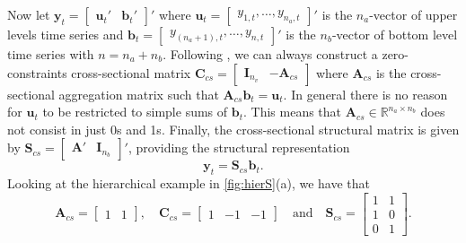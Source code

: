 \documentclass[a4paper,11pt]{article}
\newcommand{\bvet}{\bm{b}}
\newcommand{\uvet}{\bm{u}}
\newcommand{\yvet}{\bm{y}}
\newcommand{\Avet}{\bm{A}}
\newcommand{\Cvet}{\bm{C}}
\newcommand{\Ivet}{\bm{I}}
\newcommand{\Svet}{\bm{S}}
\theoremstyle{definition}
\begin{document}
Now let $\yvet_t = \begin{bmatrix}\uvet_t' & \bvet_t'\end{bmatrix}'$ where $\uvet_t = \begin{bmatrix} y_{1,t}, \dots, y_{n_a,t}\end{bmatrix}'$ is the $n_a$-vector of upper levels time series and $\bvet_t = \begin{bmatrix} y_{(n_a+1),t}, \dots, y_{n,t} \end{bmatrix}'$ is the $n_b$-vector of bottom level time series with $n = n_a+n_b$. Following \cite{giro2022}, we can always construct a zero-constraints cross-sectional matrix $\Cvet_{cs}=\begin{bmatrix}\Ivet_{n_v} & -\Avet_{cs}\end{bmatrix}$ where $\Avet_{cs}$ is the cross-sectional aggregation matrix such that $\Avet_{cs}\bvet_t = \uvet_t$. In general there is no reason for $\uvet_t$ to be restricted to simple sums of $\bvet_t$. This means that $\Avet_{cs} \in \mathbb{R}^{n_a\times n_b}$ does not consist in just 0s and 1s. Finally, the cross-sectional structural matrix is given by $\Svet_{cs} = \begin{bmatrix}\Avet' & \Ivet_{n_b}\end{bmatrix}'$, providing the structural representation \citep{hyndman2011}
$$
	\yvet_t = \Svet_{cs} \bvet_t.
$$
Looking at the hierarchical example in \autoref{fig:hierS}(a), we have that
$$
	\Avet_{cs} = \begin{bmatrix} 1 & 1 \end{bmatrix}, \quad \Cvet_{cs} = \begin{bmatrix}1 & -1 & -1 \end{bmatrix} \quad \text{and} \quad \Svet_{cs} = \begin{bmatrix}
		1 & 1 \\
		1 & 0 \\
		0 & 1
	\end{bmatrix}.
$$


\end{document}

